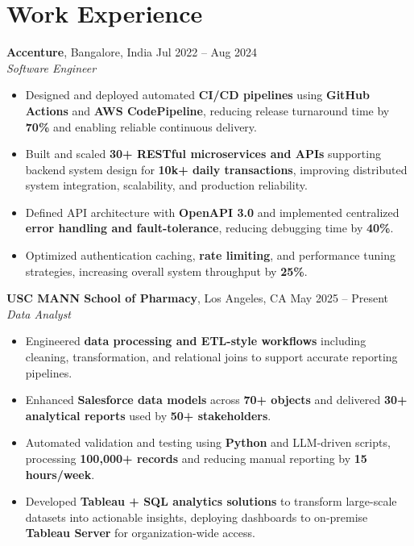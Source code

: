 \documentclass[letterpaper,11pt]{article}
\begin{document}
\section*{Work Experience}
\textbf{Accenture}, Bangalore, India \hfill Jul 2022 -- Aug 2024 \\
\textit{Software Engineer}
\begin{itemize}[noitemsep]
    \item Designed and deployed automated \textbf{CI/CD pipelines} using \textbf{GitHub Actions} and \textbf{AWS CodePipeline}, reducing release turnaround time by \textbf{70\%} and enabling reliable continuous delivery.
    \item Built and scaled \textbf{30+ RESTful microservices and APIs} supporting backend system design for \textbf{10k+ daily transactions}, improving distributed system integration, scalability, and production reliability.
    \item Defined API architecture with \textbf{OpenAPI 3.0} and implemented centralized \textbf{error handling and fault-tolerance}, reducing debugging time by \textbf{40\%}.
    \item Optimized authentication caching, \textbf{rate limiting}, and performance tuning strategies, increasing overall system throughput by \textbf{25\%}.
\end{itemize}
\textbf{USC MANN School of Pharmacy}, Los Angeles, CA \hfill May 2025 -- Present \\
\textit{Data Analyst}
\begin{itemize}[noitemsep]
    \item Engineered \textbf{data processing and ETL-style workflows} including cleaning, transformation, and relational joins to support accurate reporting pipelines.
    \item Enhanced \textbf{Salesforce data models} across \textbf{70+ objects} and delivered \textbf{30+ analytical reports} used by \textbf{50+ stakeholders}.
    \item Automated validation and testing using \textbf{Python} and LLM-driven scripts, processing \textbf{100,000+ records} and reducing manual reporting by \textbf{15 hours/week}.
    \item Developed \textbf{Tableau + SQL analytics solutions} to transform large-scale datasets into actionable insights, deploying dashboards to on-premise \textbf{Tableau Server} for organization-wide access.
\end{itemize}
\end{document}
